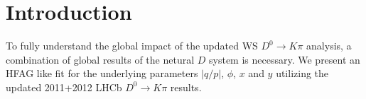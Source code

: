 
\section{Introduction}
\label{sec:Introduction}
To fully understand the global impact of the updated WS $D^0\to K\pi $ analysis, 
a combination of global results of the netural $D$ system is necessary. We present
an HFAG like fit for the underlying parameters $|q/p|$, $\phi$, $x$ and $y$ utilizing
the updated 2011+2012 LHCb $D^0\to K\pi$ results.
